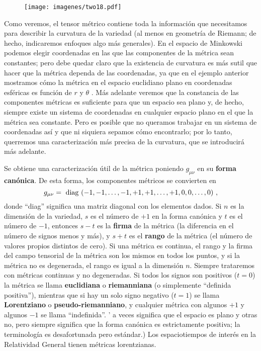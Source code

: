 \documentclass[11pt,b5paper,openany,twoside]{book}
\newcommand{\mn}{{\mu\nu}}
\begin{document}
\begin{figure}[h]
\centering
\texttt{[image: imagenes/two18.pdf]}
\end{figure}

Como veremos, el tensor métrico contiene toda la información que necesitamos para describir la curvatura de la variedad (al menos en geometría de Riemann; de hecho, indicaremos enfoques algo más generales).
En el espacio de Minkowski podemos elegir coordenadas en las que las componentes de la métrica sean constantes; pero debe quedar claro que la existencia de curvatura es más sutil que hacer que la métrica dependa de las coordenadas, ya que en el ejemplo anterior mostramos cómo la métrica en el espacio euclidiano plano en coordenadas esféricas es función de $r$ y $\theta$ .
Más adelante veremos que la constancia de las componentes métricas es suficiente para que un espacio sea plano y, de hecho, siempre existe un sistema de coordenadas en cualquier espacio plano en el que la métrica sea constante.
Pero es posible que no queramos trabajar en un sistema de coordenadas así y que ni siquiera sepamos cómo encontrarlo; por lo tanto, querremos una caracterización más precisa de la curvatura, que se introducirá más adelante.

Se obtiene una caracterización útil de la métrica poniendo $g_\mn$ en su {\bf forma canónica}.
De esta forma, los componentes métricos se convierten en
\begin{equation}
g_\mn = {\rm ~diag~}(-1,-1,\ldots,-1,+1,+1,\ldots,+1,
0,0,\ldots,0)\ ,\label{2.34}
\end{equation}
donde ``diag'' significa una matriz diagonal con los elementos dados.
Si $n$ es la dimensión de la variedad, $s$ es el número de $+1$ en la forma canónica y $t$ es el número de $-1$, entonces $s-t$ es la \textbf{firma} de la métrica (la diferencia en el número de signos menos y más), y $s+t$ es el {\bf rango} de la métrica (el número de valores propios distintos de cero).
Si una métrica es continua, el rango y la firma del campo tensorial de la métrica son los mismos en todos los puntos, y si la métrica no es degenerada, el rango es igual a la dimensión $n$.
Siempre trataremos con métricas continuas y no degeneradas.
Si todos los signos son positivos ($t=0$) la métrica se llama {\bf euclidiana} o {\bf riemanniana} (o simplemente ``definida positiva''), mientras que si hay un solo signo negativo ($t=1$) se llama {\bf Lorentziano} o {\bf pseudo-riemanniano}, y cualquier métrica con algunos $+1$ y algunos $-1$ se llama ``indefinida''. ' a veces significa que el espacio es plano y otras no, pero siempre significa que la forma canónica es estrictamente positiva; la terminología es desafortunada pero estándar.)
Los espaciotiempos de interés en la Relatividad General tienen métricas lorentzianas.
\end{document}
